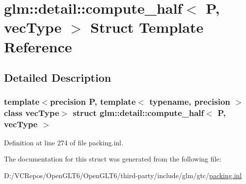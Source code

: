 \hypertarget{structglm_1_1detail_1_1compute__half}{}\section{glm\+::detail\+::compute\+\_\+half$<$ P, vec\+Type $>$ Struct Template Reference}
\label{structglm_1_1detail_1_1compute__half}


\subsection{Detailed Description}
\subsubsection*{template$<$precision P, template$<$ typename, precision $>$ class vec\+Type$>$\newline
struct glm\+::detail\+::compute\+\_\+half$<$ P, vec\+Type $>$}



Definition at line 274 of file packing.\+inl.



The documentation for this struct was generated from the following file\+:\begin{DoxyCompactItemize}
\item 
D\+:/\+V\+C\+Repos/\+Open\+G\+L\+T6/\+Open\+G\+L\+T6/third-\/party/include/glm/gtc/\mbox{\hyperlink{packing_8inl}{packing.\+inl}}\end{DoxyCompactItemize}
